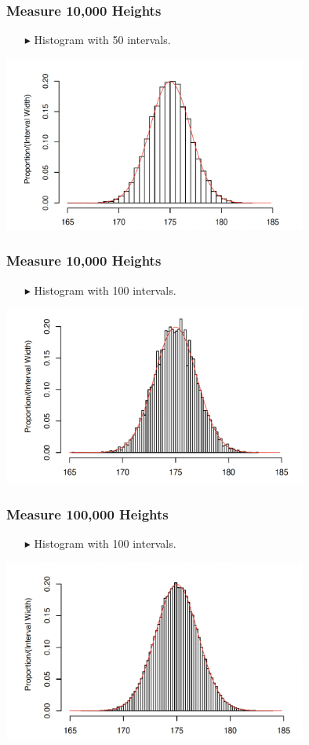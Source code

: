 \documentclass[12pt]{beamer}
\begin{document}
\begin{frame}
	\frametitle{Measure 10,000 Heights}
	\begin{itemize}
		\item[\color{blue}$\blacktriangleright$] Histogram with 50 intervals.
	\end{itemize}
	\centering
	\includegraphics[width=10cm]{histo2.png}
\end{frame}
\begin{frame}
	\frametitle{Measure 10,000 Heights}
	\begin{itemize}
		\item[\color{blue}$\blacktriangleright$] Histogram with 100 intervals.
	\end{itemize}
	\centering
	\includegraphics[width=10cm]{histo3.png}
\end{frame}
\begin{frame}
	\frametitle{Measure 100,000 Heights}
	\begin{itemize}
		\item[\color{blue}$\blacktriangleright$] Histogram with 100 intervals.
	\end{itemize}
	\centering
	\includegraphics[width=10cm]{histo4.png}
\end{frame}
\end{document}
